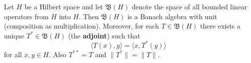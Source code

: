 Let $H$ be a Hilbert space and let $\mathfrak{B}(H)$ denote the space of all bounded linear operators from $H$ into $H$. Then $\mathfrak{B}(H)$ is a Banach algebra with unit (composition as multiplication). Moreover, for each $T \in \mathfrak{B}(H)$ there exists a unique $T^* \in \mathfrak{B}(H)$ (the \textbf{adjoint}) such that
$$\langle T(x), y \rangle = \langle x, T^*(y) \rangle$$
for all $x, y \in H$. Also $T^{**} = T$ and $\|T^*\| = \|T\|$.

